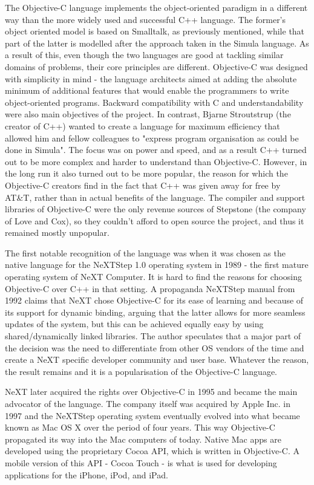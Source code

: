 \documentclass[parskip]{cs4rep}
\begin{document}
The Objective-C language implements the object-oriented paradigm in a different way than the more widely used and successful C++ language. The former's object oriented model is based on Smalltalk, as previously mentioned, while that part of the latter is modelled after the approach taken in the Simula language. As a result of this, even though the two languages are good at tackling similar domains of problems, their core principles are different. Objective-C was designed with simplicity in mind - the language architects aimed at adding the absolute minimum of additional features that would enable the programmers to write object-oriented programs. Backward compatibility with C and understandability were also main objectives of the project. In contrast, Bjarne Stroutstrup (the creator of C++) wanted to create a language for maximum efficiency that allowed him and fellow colleagues to "express program organisation as could be done in Simula"\cite{Biancuzzi2009}. The focus was on power and speed, and as a result C++ turned out to be more complex and harder to understand than Objective-C. However, in the long run it also turned out to be more popular, the reason for which the Objective-C creators find in the fact that C++ was given away for free by AT\&T, rather than in actual benefits of the language. The compiler and support libraries of Objective-C were the only revenue sources of Stepstone (the company of Love and Cox), so they couldn't afford to open source the project, and thus it remained mostly unpopular.

The first notable recognition of the language was when it was chosen as the native language for the NeXTStep 1.0 operating system in 1989 - the first mature operating system of NeXT Computer. It is hard to find the reasons for choosing Objective-C over C++ in that setting. A propaganda NeXTStep manual from 1992\cite{NeXTCorporation1991} claims that NeXT chose Objective-C for its ease of learning and because of its support for dynamic binding, arguing that the latter allows for more seamless updates of the system, but this can be achieved equally easy by using shared/dynamically linked libraries. The author speculates that a major part of the decision was the need to differentiate from other OS vendors of the time and create a NeXT specific developer community and user base. Whatever the reason, the result remains and it is a popularisation of the Objective-C language.

NeXT later acquired the rights over Objective-C in 1995 and became the main advocator of the language. The company itself was acquired by Apple Inc. in 1997 and the NeXTStep operating system eventually evolved into what became known as Mac OS X over the period of four years. This way Objective-C propagated its way into the Mac computers of today. Native Mac apps are developed using the proprietary Cocoa API, which is written in Objective-C. A mobile version of this API - Cocoa Touch - is what is used for developing applications for the iPhone, iPod, and iPad.
\end{document}

